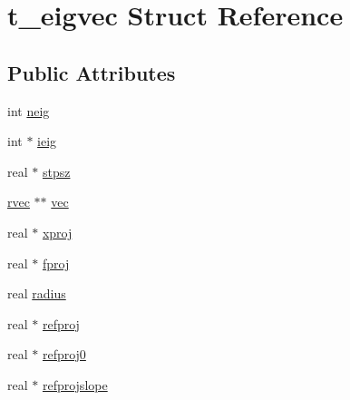 \hypertarget{structt__eigvec}{\section{t\-\_\-eigvec \-Struct \-Reference}
\label{structt__eigvec}
}
\subsection*{\-Public \-Attributes}
\begin{DoxyCompactItemize}
\item 
int \hyperlink{structt__eigvec_a50b3761c518e7dd6a6d037add3b1c58c}{neig}
\item 
int $\ast$ \hyperlink{structt__eigvec_acae5c5b628812a579a9417bf7c191ea3}{ieig}
\item 
real $\ast$ \hyperlink{structt__eigvec_a541424f6ea4b3b184f038b6f6476bd9a}{stpsz}
\item 
\hyperlink{share_2template_2gromacs_2types_2simple_8h_aa02a552a4abd2f180c282a083dc3a999}{rvec} $\ast$$\ast$ \hyperlink{structt__eigvec_a68aa70393c51dfc227bec529c144b2c4}{vec}
\item 
real $\ast$ \hyperlink{structt__eigvec_a7bd612d7fbd337f61d0a413e7197334d}{xproj}
\item 
real $\ast$ \hyperlink{structt__eigvec_a47af7c75798c82fe0292f2fda0865353}{fproj}
\item 
real \hyperlink{structt__eigvec_a37b100692b931f2461c53f52de3226a2}{radius}
\item 
real $\ast$ \hyperlink{structt__eigvec_acc1aa42bdf2c340e46497bce4154afec}{refproj}
\item 
real $\ast$ \hyperlink{structt__eigvec_a911a08f7d6b04819b35a5cc33e611cc5}{refproj0}
\item 
real $\ast$ \hyperlink{structt__eigvec_a218ec17856e96a45e79392a5e08f8567}{refprojslope}
\end{DoxyCompactItemize}


